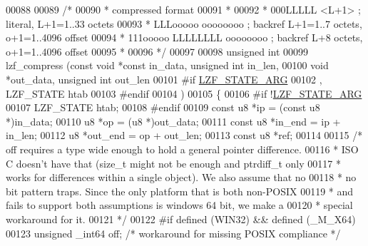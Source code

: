 \begin{DoxyCode}
00088 
00089 \textcolor{comment}{/*}
00090 \textcolor{comment}{ * compressed format}
00091 \textcolor{comment}{ *}
00092 \textcolor{comment}{ * 000LLLLL <L+1>    ; literal, L+1=1..33 octets}
00093 \textcolor{comment}{ * LLLooooo oooooooo ; backref L+1=1..7 octets, o+1=1..4096 offset}
00094 \textcolor{comment}{ * 111ooooo LLLLLLLL oooooooo ; backref L+8 octets, o+1=1..4096 offset}
00095 \textcolor{comment}{ *}
00096 \textcolor{comment}{ */}
00097 
00098 \textcolor{keywordtype}{unsigned} \textcolor{keywordtype}{int}
00099 lzf\_compress (\textcolor{keyword}{const} \textcolor{keywordtype}{void} *\textcolor{keyword}{const} in\_data, \textcolor{keywordtype}{unsigned} \textcolor{keywordtype}{int} in\_len,
00100           \textcolor{keywordtype}{void} *out\_data, \textcolor{keywordtype}{unsigned} \textcolor{keywordtype}{int} out\_len
00101 \textcolor{preprocessor}{#}\textcolor{preprocessor}{if} \hyperlink{lzfP_8h_a2bf88c8c88ba8168003f54ea1970367a}{LZF\_STATE\_ARG}
00102               , LZF\_STATE htab
00103 \textcolor{preprocessor}{#}\textcolor{preprocessor}{endif}
00104               )
00105 \{
00106 \textcolor{preprocessor}{#}\textcolor{preprocessor}{if} \textcolor{preprocessor}{!}\hyperlink{lzfP_8h_a2bf88c8c88ba8168003f54ea1970367a}{LZF\_STATE\_ARG}
00107   LZF\_STATE htab;
00108 \textcolor{preprocessor}{#}\textcolor{preprocessor}{endif}
00109   \textcolor{keyword}{const} u8 *ip = (\textcolor{keyword}{const} u8 *)in\_data;
00110         u8 *op = (u8 *)out\_data;
00111   \textcolor{keyword}{const} u8 *in\_end  = ip + in\_len;
00112         u8 *out\_end = op + out\_len;
00113   \textcolor{keyword}{const} u8 *ref;
00114 
00115   \textcolor{comment}{/* off requires a type wide enough to hold a general pointer difference.}
00116 \textcolor{comment}{   * ISO C doesn't have that (size\_t might not be enough and ptrdiff\_t only}
00117 \textcolor{comment}{   * works for differences within a single object). We also assume that no}
00118 \textcolor{comment}{   * no bit pattern traps. Since the only platform that is both non-POSIX}
00119 \textcolor{comment}{   * and fails to support both assumptions is windows 64 bit, we make a}
00120 \textcolor{comment}{   * special workaround for it.}
00121 \textcolor{comment}{   */}
00122 \textcolor{preprocessor}{#}\textcolor{preprocessor}{if} \textcolor{preprocessor}{defined} \textcolor{preprocessor}{(}\textcolor{preprocessor}{WIN32}\textcolor{preprocessor}{)} \textcolor{preprocessor}{&&} \textcolor{preprocessor}{defined} \textcolor{preprocessor}{(}\textcolor{preprocessor}{\_M\_X64}\textcolor{preprocessor}{)}
00123   \textcolor{keywordtype}{unsigned} \_int64 off; \textcolor{comment}{/* workaround for missing POSIX compliance */}

\end{DoxyCode}
